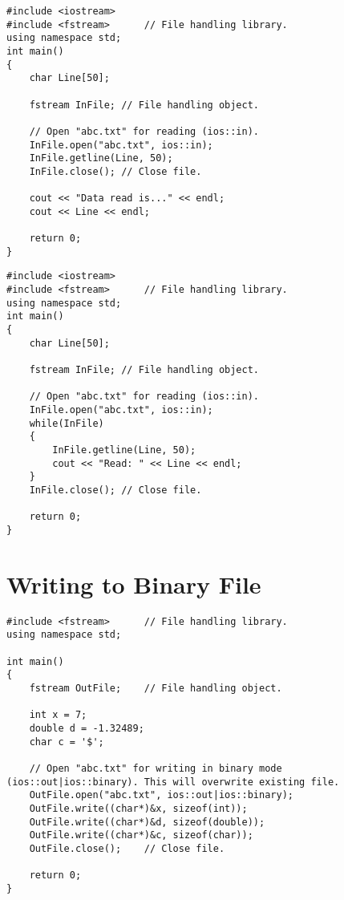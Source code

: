 \documentclass[12pt,a4paper]{article}
\begin{document}
\begin{lstlisting}[caption={Reading a line from text file}]
#include <iostream>
#include <fstream>		// File handling library.
using namespace std;
int main()
{
	char Line[50];

	fstream InFile;	// File handling object.

	// Open "abc.txt" for reading (ios::in).
	InFile.open("abc.txt", ios::in);
	InFile.getline(Line, 50);
	InFile.close();	// Close file.
	
	cout << "Data read is..." << endl;
	cout << Line << endl;

	return 0;
}
\end{lstlisting}
\begin{lstlisting}[caption={Reading a whole text file line--by--line}]
#include <iostream>
#include <fstream>		// File handling library.
using namespace std;
int main()
{
	char Line[50];

	fstream InFile;	// File handling object.

	// Open "abc.txt" for reading (ios::in).
	InFile.open("abc.txt", ios::in);
	while(InFile)
	{
		InFile.getline(Line, 50);
		cout << "Read: " << Line << endl;
	}
	InFile.close();	// Close file.

	return 0;
}
\end{lstlisting}
\section{Writing to Binary File}
\begin{lstlisting}[caption={Writing to binary file}]
#include <fstream>		// File handling library.
using namespace std;

int main()
{
	fstream OutFile;	// File handling object.

	int x = 7;
	double d = -1.32489;
	char c = '$';

	// Open "abc.txt" for writing in binary mode (ios::out|ios::binary). This will overwrite existing file.
	OutFile.open("abc.txt", ios::out|ios::binary);
	OutFile.write((char*)&x, sizeof(int));
	OutFile.write((char*)&d, sizeof(double));
	OutFile.write((char*)&c, sizeof(char));
	OutFile.close();	// Close file.

	return 0;
}
\end{lstlisting}
\end{document}
